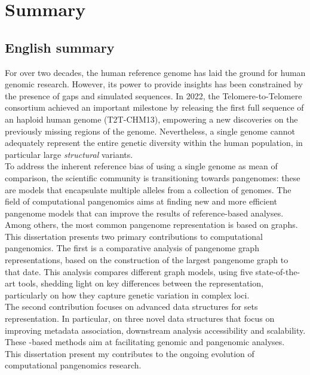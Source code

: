  \chapter{Summary}
\label{sec:Summary}
\section{English summary}
For over two decades, the human reference genome has laid the ground for human genomic research. However, its power to provide insights has been constrained by the presence of gaps and simulated sequences. In 2022, the Telomere-to-Telomere consortium achieved an important milestone by releasing the first full sequence of an haploid human genome (T2T-CHM13), empowering a new discoveries on the previously missing regions of the genome. Nevertheless, a single genome cannot adequately represent the entire genetic diversity within the human population, in particular large \emph{structural} variants.\\
To address the inherent reference bias of using a single genome as mean of comparison, the scientific community is transitioning towards pangenomes: these are models that encapsulate multiple alleles from a collection of genomes. The field of computational pangenomics aims at finding new and more efficient pangenome models that can improve the results of reference-based analyses. Among others, the most common pangenome representation is based on graphs. \\
This dissertation presents two primary contributions to computational pangenomics. The first is a comparative analysis of pangenome graph representations, based on the construction of the largest pangenome graph to that date. This analysis compares different graph models, using five state-of-the-art tools, shedding light on key differences between the representation, particularly on how they capture genetic variation in complex loci.\\
The second contribution focuses on advanced data structures for \kmer sets representation. In particular, on three novel data structures that focus on improving metadata association, downstream analysis accessibility and scalability. These \kmer-based methods aim at facilitating genomic and pangenomic analyses.\\
This dissertation present my contributes to the ongoing evolution of computational pangenomics research.
